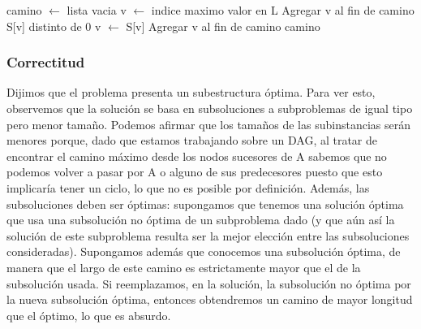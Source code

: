 \begin{algorithm}[H]
\caption{} 
\label{pseudocodigo_armarCamino}
\begin{codebox}
\li camino $\gets$ lista vacia
\li v $\gets$ indice maximo valor en L
\li Agregar v al fin de camino 
\li	\While S[v] distinto de 0 \Do
\li		v $\gets$ S[v]
\li		Agregar v al fin de camino
	\End
\li \Return camino	
	\End
\end{codebox}
\end{algorithm}

\subsubsection{Correctitud} 

Dijimos que el problema presenta un subestructura \'optima. Para ver esto, observemos que la soluci\'on se basa en subsoluciones a subproblemas de igual tipo pero menor tama\~no. 
Podemos afirmar que los tama\~nos de las subinstancias ser\'an menores porque, dado que estamos trabajando sobre un DAG, al tratar de encontrar el camino m\'aximo desde los nodos sucesores de A sabemos que no podemos volver a pasar por A o alguno de sus predecesores puesto que esto implicar\'ia tener un ciclo, lo que no es posible por definici\'on. 
Adem\'as, las subsoluciones deben ser \'optimas: supongamos que tenemos una soluci\'on \'optima que usa una subsoluci\'on no \'optima de un subproblema dado (y que a\'un as\'i la soluci\'on de este subproblema resulta ser la mejor elecci\'on entre las subsoluciones consideradas). Supongamos adem\'as que conocemos una subsoluci\'on \'optima, de manera que el largo de este camino es estrictamente mayor que el de la subsoluci\'on usada. Si reemplazamos, en la soluci\'on, la subsoluci\'on no \'optima por la nueva subsoluci\'on \'optima, entonces obtendremos un camino de mayor longitud que el \'optimo, lo que es absurdo.

